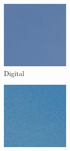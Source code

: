 \begin{figure}
    \begin{subfigure}[t]{.19\textwidth}
        \centering
        \includegraphics[width=\linewidth]{figures/digital-sky.png}
        \captionsetup{justification=centering}
        \caption{Digital}
      \end{subfigure}
    \hfill
    \begin{subfigure}[t]{.19\textwidth}
        \centering
        \includegraphics[width=\linewidth]{figures/film-sky.png}

\end{subfigure}
\end{figure}
